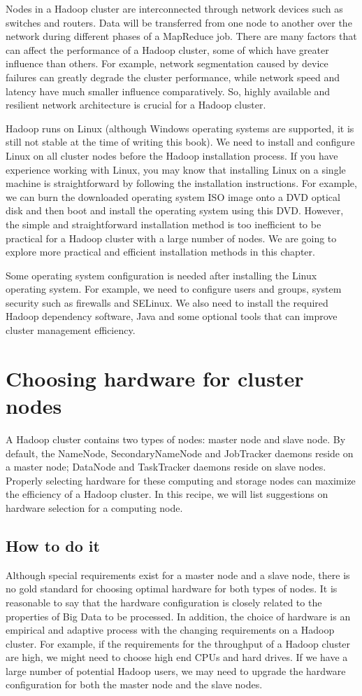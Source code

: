 Nodes in a Hadoop cluster are interconnected through network devices such as switches and routers. Data will be transferred from one node to another over the network during different phases of a MapReduce job. There are many factors that can affect the performance of a Hadoop cluster, some of which have greater influence than others. For example, network segmentation caused by device failures can greatly degrade the cluster performance, while network speed and latency have much smaller influence comparatively. So, highly available and resilient network architecture is crucial for a Hadoop cluster.

Hadoop runs on Linux (although Windows operating systems are supported, it is still not stable at the time of writing this book). We need to install and configure Linux on all cluster nodes before the Hadoop installation process. If you have experience working with Linux, you may know that installing Linux on a single machine is straightforward by following the installation instructions. For example, we can burn the downloaded operating system ISO image onto a DVD optical disk and then boot and install the operating system using this DVD. However, the simple and straightforward installation method is too inefficient to be practical for a Hadoop cluster with a large number of nodes. We are going to explore more practical and efficient installation methods in this chapter.

Some operating system configuration is needed after installing the Linux operating system. For example, we need to configure users and groups, system security such as firewalls and SELinux. We also need to install the required Hadoop dependency software, Java and some optional tools that can improve cluster management efficiency.
\section{Choosing hardware for cluster nodes}
A Hadoop cluster contains two types of nodes: master node and slave node. By default, the NameNode, SecondaryNameNode and JobTracker daemons reside on a master node; DataNode and TaskTracker daemons reside on slave nodes. Properly selecting hardware for these computing and storage nodes can maximize the efficiency of a Hadoop cluster. In this recipe, we will list suggestions on hardware selection for a computing node.
\subsection*{How to do it}
Although special requirements exist for a master node and a slave node, there is no gold standard for choosing optimal hardware for both types of nodes. It is reasonable to say that the hardware configuration is closely related to the properties of Big Data to be processed. In addition, the choice of hardware is an empirical and adaptive process with the changing requirements on a Hadoop cluster. For example, if the requirements for the throughput of a Hadoop cluster are high, we might need to choose high end CPUs and hard drives. If we have a large number of potential Hadoop users, we may need to upgrade the hardware configuration for both the master node and the slave nodes.

